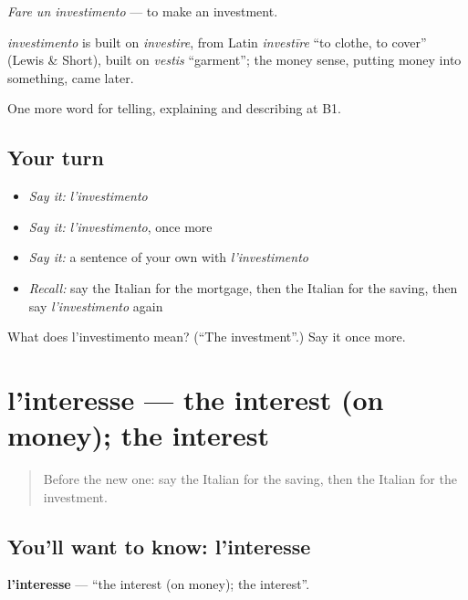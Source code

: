 \emph{Fare un investimento} — to make an investment.

\begin{cousinweb}
\emph{investimento} is built on \emph{investire}, from Latin \emph{investīre} \textquotedblleft{}to clothe, to cover\textquotedblright{} (Lewis \& Short), built on \emph{vestis} \textquotedblleft{}garment\textquotedblright{}; the money sense, putting money into something, came later.
\end{cousinweb}

\begin{grammarlens}[title={What you've built}]
One more word for telling, explaining and describing at B1.
\end{grammarlens}

\subsection*{Your turn}
\begin{itemize}
\raggedright
  \item \emph{Say it:} \emph{l'investimento}
  \item \emph{Say it:} \emph{l'investimento}, once more
  \item \emph{Say it:} a sentence of your own with \emph{l'investimento}
  \item \emph{Recall:} say the Italian for the mortgage, then the Italian for the saving, then say \emph{l'investimento} again
\end{itemize}

\begin{tcolorbox}[breakable,colback=teal!4,colframe=teal!35!black,title={Before you move on}]
What does l'investimento mean? (\textquotedblleft{}The investment\textquotedblright{}.) Say it once more.
\end{tcolorbox}
\section[l'interesse]{l'interesse — the interest (on money); the interest}

\label{lesson:IT-C395-interesse}



\begin{quote}
Before the new one: say the Italian for the saving, then the Italian for the investment.
\end{quote}

\subsection*{You'll want to know: l'interesse}
\textbf{l'interesse} — \textquotedblleft{}the interest (on money); the interest\textquotedblright{}.

